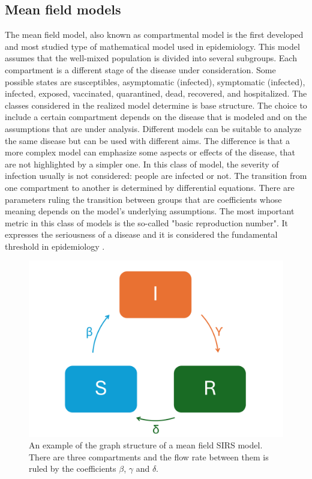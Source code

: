 \subsection{Mean field models}
\label{subsec:mean_field}
The mean field model, also known as compartmental model is the first developed and most studied type of mathematical model used in epidemiology.  This model assumes that the well-mixed population is divided into several subgroups. Each compartment is a different stage of the disease under consideration. Some possible states are susceptibles, asymptomatic (infected), symptomatic (infected), infected, exposed, vaccinated, quarantined, dead, recovered, and hospitalized. The classes considered in the realized model determine is base structure. The choice to include a certain compartment depends on the disease that is modeled and on the assumptions that are under analysis. Different models can be suitable to analyze the same disease but can be used with different aims. The difference is that a more complex model can emphasize some aspects or effects of the disease, that are not highlighted by a simpler one. 
In this class of model, the severity of infection usually is not considered: people are infected or not. The transition from one compartment to another is determined by differential equations. There are parameters ruling the transition between groups that are coefficients whose meaning depends on the model's underlying assumptions. The most important metric in this class of models is the so-called "basic reproduction number". It expresses the seriousness of a disease and it is considered the fundamental threshold in epidemiology \cite{Hernandez_Vargas_2022}. 
\begin{figure}[]
	\centering
	\includegraphics[width=0.65\linewidth]{0_introduction/images_introduction/SIRS_figure_compartmental}
	\caption[SIRS example]{An example of the graph structure of a mean field SIRS model. There are three compartments and the flow rate between them is ruled by the coefficients $\beta$, $\gamma$ and $\delta$.}
	\label{fig:sirsfigurecompartmental}
\end{figure}


